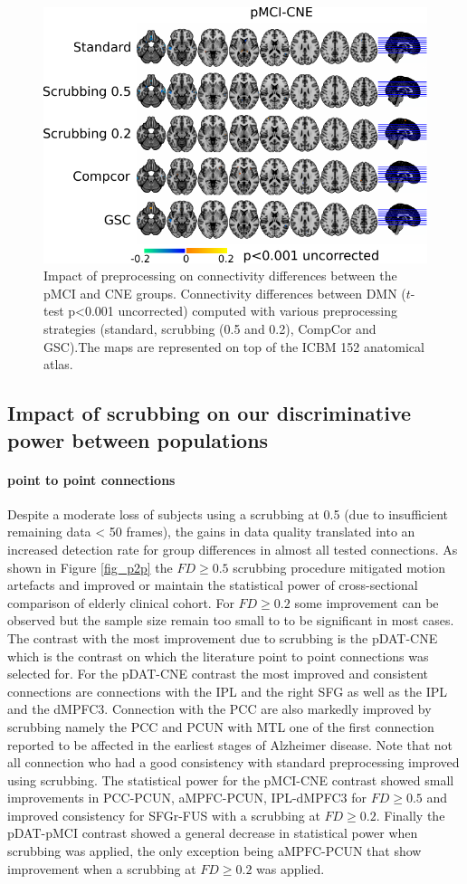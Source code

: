 \begin{figure}[H]
\begin{center}
\includegraphics[width=0.60\linewidth]{../figures/scrubbing_impact_pMCI-CNE.pdf}
\end{center}
\caption[Scrubbing impact on group differences]{ Impact of preprocessing on connectivity differences between the pMCI and CNE groups. Connectivity differences between DMN ($t$-test p<0.001 uncorrected) computed with various preprocessing strategies (standard, scrubbing (0.5 and 0.2), CompCor and GSC).The maps are represented on top of the ICBM 152 anatomical atlas.
}
\label{fig_impact_pMCI-CNE}
\end{figure}


\subsection{Impact of scrubbing on our discriminative power between populations}
\paragraph{point to point connections}
Despite a moderate loss of subjects using a scrubbing at 0.5 (due to insufficient remaining data < 50 frames), the gains in data quality translated into an increased detection rate for group differences in almost all tested connections. As shown in Figure \ref{fig_p2p} the $FD\geq0.5$ scrubbing procedure mitigated motion artefacts and improved or maintain the statistical power of cross-sectional comparison of elderly clinical cohort. For $FD\geq0.2$ some improvement can be observed but the sample size remain too small to to be significant in most cases. The contrast with the most improvement due to scrubbing is the pDAT-CNE which is the contrast on which the literature point to point connections was selected for. For the pDAT-CNE contrast the most improved and consistent connections are connections with the IPL and the right SFG as well as the IPL and the dMPFC3. Connection with the PCC are also markedly improved by scrubbing namely the PCC and PCUN with MTL one of the first connection reported to be 
affected in the earliest stages of Alzheimer disease. Note that not all connection who had a good consistency with standard preprocessing improved using scrubbing. The statistical power for the pMCI-CNE contrast showed small improvements in PCC-PCUN, aMPFC-PCUN, IPL-dMPFC3 for $FD\geq0.5$ and improved consistency for SFGr-FUS with a scrubbing at $FD\geq0.2$. Finally the pDAT-pMCI contrast showed a general decrease in statistical power when scrubbing was applied, the only exception being aMPFC-PCUN that show improvement when a scrubbing at $FD\geq0.2$ was applied.

